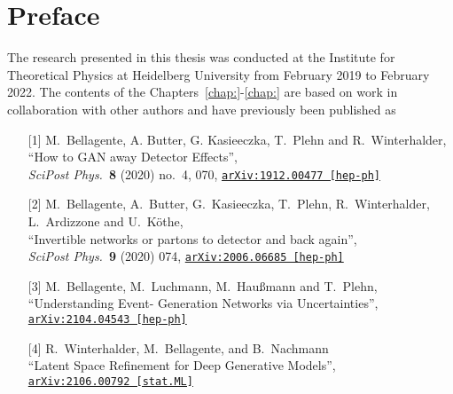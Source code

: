 %
%
%

\chapter*{Preface}

The research presented in this thesis was conducted at the Institute 
for Theoretical Physics at Heidelberg University from February 2019 to
February 2022. 
The contents of the Chapters~\ref{chap:}-\ref{chap:}
are based on work in collaboration with other authors and have previously 
been published as~%
%
\begin{itemize}
	\item[{[1]}] M.~Bellagente, A. Butter, G. Kasieeczka, T.~Plehn and R.~Winterhalder,\\
			``How to GAN away Detector Effects'',\\
			\textit{SciPost Phys.}~\textbf{8} (2020) no.~4, 070, 
			\href{https://arxiv.org/abs/1912.00477}{\texttt{arXiv:1912.00477 [hep-ph]}}
	\item[{[2]}] M.~Bellagente, A.~Butter, G.~Kasieeczka, T.~Plehn, R.~Winterhalder, L.~Ardizzone and U.~Köthe,\\
			``Invertible networks or partons to detector and back again'',\\
			\textit{SciPost Phys.}~\textbf{9} (2020) 074, 
			\href{https://arxiv.org/abs/2006.06685}{\texttt{arXiv:2006.06685 [hep-ph]}}
	\item[{[3]}] M.~Bellagente,  M.~Luchmann, M.~Haußmann and T.~Plehn,\\
			``Understanding Event- Generation Networks via Uncertainties'',\\
			\href{https://arxiv.org/pdf/2104.04543.pdf}{\texttt{arXiv:2104.04543 [hep-ph]}}
	\item[{[4]}] R.~Winterhalder,  M.~Bellagente, and B.~Nachmann\\
			``Latent Space Refinement for Deep Generative Models'',\\
			\href{https://arxiv.org/pdf/2106.00792.pdf}{\texttt{arXiv:2106.00792 [stat.ML]}}
			
\end{itemize}
%



%
